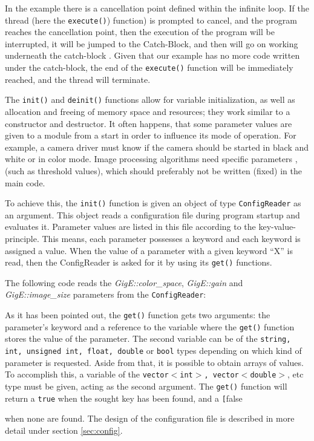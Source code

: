 \documentclass[a4paper, 11pt]{article}
\newcommand{\code}[1]{\texttt{#1}}
\newcommand{\codeex}[2][0.98\textwidth]{\vspace*{1ex}\noindent\fbox{\parbox{#1}{}}\vspace*{1ex}}
\begin{document}
{In the example there is a cancellation point defined within the infinite loop. If the thread (here the \code{execute()}) function) is prompted to cancel, and the program reaches the cancellation point, then the execution of the program will be interrupted, it will be jumped to the Catch-Block, and then will go on working underneath the catch-block . Given that our example has no more code written under the catch-block, the end of the \code{execute()} function will be immediately reached, and the thread will terminate.

The \code{init()} and \code{deinit()} functions allow for variable initialization, as well as allocation and freeing of memory space and resources; they work similar to a constructor and destructor. It often happens, that some parameter values are given to a module from a start in order to influence its mode of operation. For example, a camera driver must know if the camera should be started in black and white or in color mode. 
Image processing algorithms need specific parameters ,(such as threshold values), which should preferably not be written (fixed) in the main code. 

To achieve this, the \code{init()} function is given an object of type \code{ConfigReader} as an argument. This object reads a configuration file during program startup and evaluates it. Parameter values are listed in this file according to the key-value-principle. This means, each parameter possesses a keyword and each keyword is assigned a value. When the value of a parameter with a given keyword “X” is read, then the ConfigReader is asked for it by using its \code{get()} functions.

\codeex{Example}
The following code reads the \textit{GigE::color\_space}, \textit{GigE::gain} and \textit{GigE::image\_size} parameters from the \code{ConfigReader}:

\codeex{beispielConfigReaderAnfrage.cpp}

As it has been pointed out, the \code{get()} function gets two arguments: the parameter’s keyword and a reference to the variable where the \code{get()} function stores the value of the parameter. The second variable can be of the \code{string, int, unsigned int, float, double} or \code{bool} types depending on which kind of parameter is requested. Aside from that, it is possible to obtain arrays of values. To accomplish this, a variable of the \code{vector$<$int$>$, vector$<$double$>$}, etc type must be given, acting as the second argument. The \code{get()} function will return a \code{true} when the sought key has been found, and a \code[false} when none are found. The design of the configuration file is described in more detail under section \ref{sec:config}.
\end{document}
